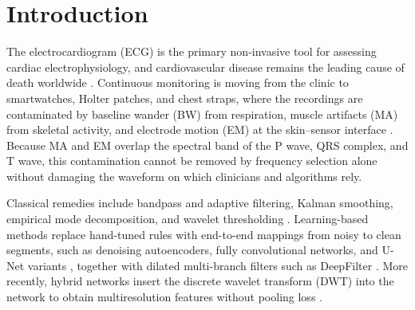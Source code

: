 \section{Introduction}
\label{sec:intro}

The electrocardiogram (ECG) is the primary non-invasive tool for assessing cardiac electrophysiology, and cardiovascular disease remains the leading cause of death worldwide \cite{clifford2006}. Continuous monitoring is moving from the clinic to smartwatches, Holter patches, and chest straps, where the recordings are contaminated by baseline wander (BW) from respiration, muscle artifacts (MA) from skeletal activity, and electrode motion (EM) at the skin--sensor interface \cite{clifford2006,jin2024}. Because MA and EM overlap the spectral band of the P wave, QRS complex, and T wave, this contamination cannot be removed by frequency selection alone without damaging the waveform on which clinicians and algorithms rely.

Classical remedies include bandpass and adaptive filtering, Kalman smoothing, empirical mode decomposition, and wavelet thresholding \cite{clifford2006,goldberger2000}. Learning-based methods replace hand-tuned rules with end-to-end mappings from noisy to clean segments, such as denoising autoencoders, fully convolutional networks, and U-Net variants \cite{vincent2008,chiang2019,xiong2016,ronneberger2015}, together with dilated multi-branch filters such as DeepFilter \cite{romero2021}. More recently, hybrid networks insert the discrete wavelet transform (DWT) into the network to obtain multiresolution features without pooling loss \cite{jin2024,nguyen2026dwse,nguyen2026liwave}.

